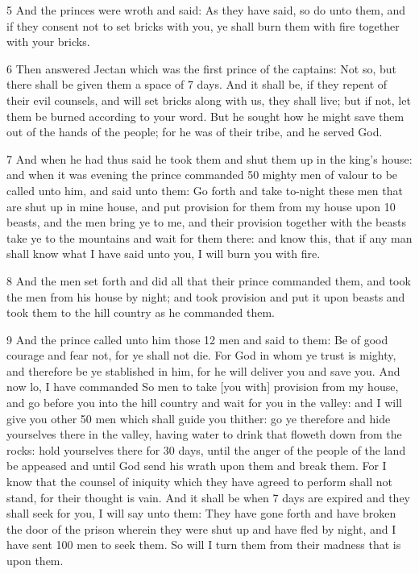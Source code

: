 \par 5 And the princes were wroth and said: As they have said, so do unto them, and if they consent not to set bricks with you, ye shall burn them with fire together with your bricks. 

\par 6 Then answered Jectan which was the first prince of the captains: Not so, but there shall be given them a space of 7 days. And it shall be, if they repent of their evil counsels, and will set bricks along with us, they shall live; but if not, let them be burned according to your word. But he sought how he might save them out of the hands of the people; for he was of their tribe, and he served God.

\par 7 And when he had thus said he took them and shut them up in the king's house: and when it was evening the prince commanded 50 mighty men of valour to be called unto him, and said unto them: Go forth and take to-night these men that are shut up in mine house, and put provision for them from my house upon 10 beasts, and the men bring ye to me, and their provision together with the beasts take ye to the mountains and wait for them there: and know this, that if any man shall know what I have said unto you, I will burn you with fire.

\par 8 And the men set forth and did all that their prince commanded them, and took the men from his house by night; and took provision and put it upon beasts and took them to the hill country as he commanded them.

\par 9 And the prince called unto him those 12 men and said to them: Be of good courage and fear not, for ye shall not die. For God in whom ye trust is mighty, and therefore be ye stablished in him, for he will deliver you and save you. And now lo, I have commanded So men to take [you with] provision from my house, and go before you into the hill country and wait for you in the valley: and I will give you other 50 men which shall guide you thither: go ye therefore and hide yourselves there in the valley, having water to drink that floweth down from the rocks: hold yourselves there for 30 days, until the anger of the people of the land be appeased and until God send his wrath upon them and break them. For I know that the counsel of iniquity which they have agreed to perform shall not stand, for their thought is vain. And it shall be when 7 days are expired and they shall seek for you, I will say unto them: They have gone forth and have broken the door of the prison wherein they were shut up and have fled by night, and I have sent 100 men to seek them. So will I turn them from their madness that is upon them.


